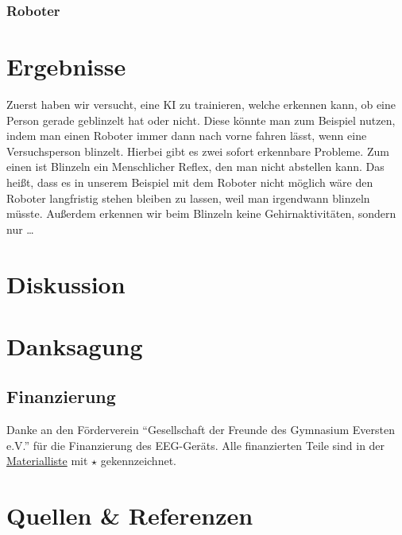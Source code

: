 \documentclass{scrartcl}
\begin{document}
	\subsubsection{Roboter}

	\section{Ergebnisse}

	Zuerst haben wir versucht, eine KI zu trainieren, welche erkennen kann, ob eine Person gerade geblinzelt hat oder nicht. Diese könnte man zum Beispiel nutzen, indem man einen Roboter immer dann nach vorne fahren lässt, wenn eine Versuchsperson blinzelt. Hierbei gibt es zwei sofort erkennbare Probleme. Zum einen ist Blinzeln ein Menschlicher Reflex, den man nicht abstellen kann. Das heißt, dass es in unserem Beispiel mit dem Roboter nicht möglich wäre den Roboter langfristig stehen bleiben zu lassen, weil man irgendwann blinzeln müsste. Außerdem erkennen wir beim Blinzeln keine Gehirnaktivitäten, sondern nur … 

	

	\section{Diskussion}

	\section{Danksagung}

	\subsection{Finanzierung} \label{Foerderverein}

	Danke an den Förderverein \enquote{Gesellschaft der Freunde des Gymnasium Eversten e.V.} für die Finanzierung des EEG-Geräts. Alle finanzierten Teile sind in der \hyperref[Materialien]{Materialliste} mit $\star$ gekennzeichnet. 

	\section{Quellen \& Referenzen}

	\printbibliography{}
\end{document}
